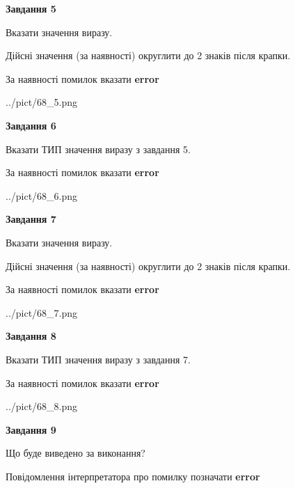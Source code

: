 \documentclass[11pt, ukrainian]{article}
\begin{document}
{\begin {large}
{\begin {center}\textbf{Завдання 5}\end {center}}\par
Вказати значення виразу. \par
Дійсні значення (за наявності) округлити до 2 знаків після крапки. \par
За наявності помилок вказати \textbf{error}

\begin{center}
	{../pict/68_5.png}
\end{center}
\newpage

{\begin {center}\textbf{Завдання 6}\end {center}}\par
Вказати ТИП значення виразу з завдання 5. \par
За наявності помилок вказати \textbf{error}

\begin{center}
	{../pict/68_6.png}
\end{center}
\newpage

{\begin {center}\textbf{Завдання 7}\end {center}}\par
Вказати значення виразу. \par
Дійсні значення (за наявності) округлити до 2 знаків після крапки. \par
За наявності помилок вказати \textbf{error}

\begin{center}
	{../pict/68_7.png}
\end{center}
\newpage

{\begin {center}\textbf{Завдання 8}\end {center}}\par
Вказати ТИП значення виразу з завдання 7. \par
За наявності помилок вказати \textbf{error}

\begin{center}
	{../pict/68_8.png}
\end{center}
\newpage

{\begin {center}\textbf{Завдання 9}\end {center}}\par
Що буде виведено за виконання? \par
Повідомлення інтерпретатора про помилку позначати \textbf{error}


\end{large}}
\end{document}
